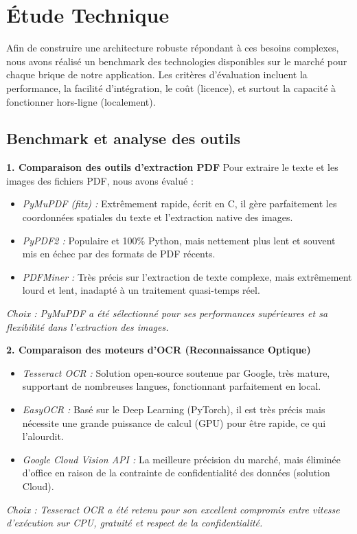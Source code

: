 \section{Étude Technique}

Afin de construire une architecture robuste répondant à ces besoins complexes, nous avons réalisé un benchmark des technologies disponibles sur le marché pour chaque brique de notre application. Les critères d'évaluation incluent la performance, la facilité d'intégration, le coût (licence), et surtout la capacité à fonctionner hors-ligne (localement).

\subsection{Benchmark et analyse des outils}

\textbf{1. Comparaison des outils d'extraction PDF}
Pour extraire le texte et les images des fichiers PDF, nous avons évalué :
\begin{itemize}
    \item \textit{PyMuPDF (fitz) :} Extrêmement rapide, écrit en C, il gère parfaitement les coordonnées spatiales du texte et l'extraction native des images.
    \item \textit{PyPDF2 :} Populaire et 100\% Python, mais nettement plus lent et souvent mis en échec par des formats de PDF récents.
    \item \textit{PDFMiner :} Très précis sur l'extraction de texte complexe, mais extrêmement lourd et lent, inadapté à un traitement quasi-temps réel.
\end{itemize}
\textit{Choix : PyMuPDF a été sélectionné pour ses performances supérieures et sa flexibilité dans l'extraction des images.}

\textbf{2. Comparaison des moteurs d'OCR (Reconnaissance Optique)}
\begin{itemize}
    \item \textit{Tesseract OCR :} Solution open-source soutenue par Google, très mature, supportant de nombreuses langues, fonctionnant parfaitement en local.
    \item \textit{EasyOCR :} Basé sur le Deep Learning (PyTorch), il est très précis mais nécessite une grande puissance de calcul (GPU) pour être rapide, ce qui l'alourdit.
    \item \textit{Google Cloud Vision API :} La meilleure précision du marché, mais éliminée d'office en raison de la contrainte de confidentialité des données (solution Cloud).
\end{itemize}
\textit{Choix : Tesseract OCR a été retenu pour son excellent compromis entre vitesse d'exécution sur CPU, gratuité et respect de la confidentialité.}

